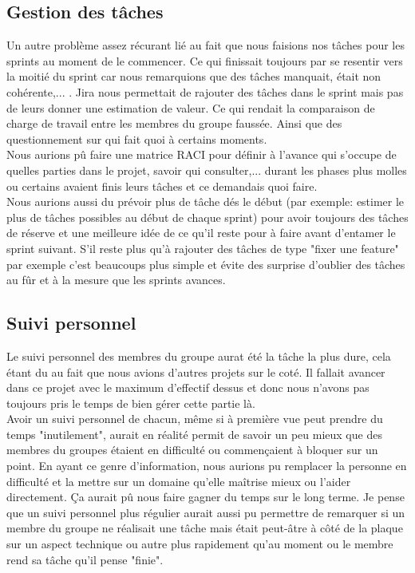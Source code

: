 \documentclass[t, 12pt, usenames,dvipsnames]{article}
\begin{document}
     \subsection{Gestion des tâches}
     \noindent Un autre problème assez récurant lié au fait que nous faisions nos tâches pour les sprints au moment de le commencer. Ce qui finissait toujours par se resentir vers la moitié du sprint car nous remarquions que des tâches manquait, était non cohérente,... . Jira nous permettait de rajouter des tâches dans le sprint mais pas de leurs donner une estimation de valeur. Ce qui rendait la comparaison de charge de travail entre les membres du groupe faussée. Ainsi que des questionnement sur qui fait quoi à certains moments.
     \\ Nous aurions pû faire une matrice RACI pour définir à l'avance qui s'occupe de quelles parties dans le projet, savoir qui consulter,... durant les phases plus molles ou certains avaient finis leurs tâches et ce demandais quoi faire. \\
     Nous aurions aussi du prévoir plus de tâche dés le début (par exemple: estimer le plus de tâches possibles au début de chaque sprint) pour avoir toujours des tâches de réserve et une meilleure idée de ce qu'il reste pour à faire avant d'entamer le sprint suivant. S'il reste plus qu'à rajouter des tâches de type "fixer une feature" par exemple c'est beaucoups plus simple et évite des surprise d'oublier des tâches au fûr et à la mesure que les sprints avances.
     
     \subsection{Suivi personnel}
     \noindent Le suivi personnel des membres du groupe aurat été la tâche la plus dure, cela étant du au fait que nous avions d'autres projets sur le coté. Il fallait avancer dans ce projet avec le maximum d'effectif dessus et donc nous n'avons pas toujours pris le temps de bien gérer cette partie là.  \\
     Avoir un suivi personnel de chacun, même si à première vue peut prendre du temps "inutilement", aurait en réalité permit de savoir un peu mieux que des membres du groupes étaient en difficulté ou commençaient à bloquer sur un point. En ayant ce genre d'information, nous aurions pu remplacer la personne en difficulté et la mettre sur un domaine qu'elle maîtrise mieux ou l'aider directement. Ça aurait pû nous faire gagner du temps sur le long terme. Je pense que un suivi personnel plus régulier aurait aussi pu permettre de remarquer si un membre du groupe ne réalisait une tâche mais était peut-âtre à côté de la plaque sur un aspect technique ou autre plus rapidement qu'au moment ou le membre rend sa tâche qu'il pense "finie".
\end{document}
